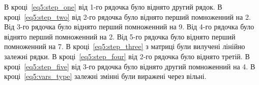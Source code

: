\documentclass{report}
\begin{document}
В кроці~\eqref{eq5:step_one} від 1-го рядочка було віднято другий рядок.
В кроці~\eqref{eq5:step_two} від 2-го рядочка було віднято перший помноженний на 2. Від 3-го рядочка було віднято перший помноженний на 9. Від 4-го рядочка було віднято перший помноженний на 2. Від 5-го рядочка було віднято перший помноженний на 7.
В кроці~\eqref{eq5:step_three} з матриці були вилучені лінійно залежні рядки.
В кроці~\eqref{eq5:step_four} від 2-го рядочка було віднято третій.
В кроці~\eqref{eq5:step_five} від 3-го рядочка було віднято другий помноженний на 4.
В кроці~\eqref{eq5:vars_type} залежні змінні були виражені через вільні.
\end{document}
